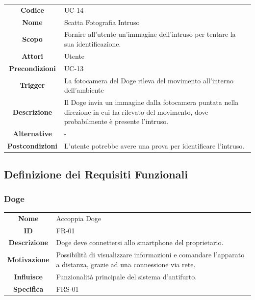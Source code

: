 \documentclass{article}
\begin{document}
\begin{adjustbox}{center}
\begin{tabular}{|c|p{10cm}|}
\hline
\textbf{Codice} & UC-14 \\
\textbf{Nome} & Scatta Fotografia Intruso \\
\textbf{Scopo} & Fornire all'utente un'immagine dell'intruso per tentare la sua identificazione. \\
\textbf{Attori} & Utente \\
\textbf{Precondizioni} & UC-13 \\
\textbf{Trigger} & La fotocamera del Doge rileva del movimento all'interno dell'ambiente \\
\textbf{Descrizione} & Il Doge invia un immagine dalla fotocamera puntata nella direzione in cui ha rilevato del movimento, dove probabilmente è presente
l'intruso. \\
\textbf{Alternative} & - \\
\textbf{Postcondizioni} & L'utente potrebbe avere una prova per identificare l'intruso. \\
\hline
\end{tabular}
\end{adjustbox}

\subsection{Definizione dei Requisiti Funzionali}

\subsubsection{Doge}

\begin{adjustbox}{center}
\begin{tabular}{|c|p{10cm}|}
\hline
\textbf{Nome} & Accoppia Doge \\
\textbf{ID} & FR-01 \\
\textbf{Descrizione} & Doge deve connettersi allo smartphone del proprietario. \\
\textbf{Motivazione} & Possibilità di visualizzare informazioni e comandare l'apparato a distanza, grazie ad una connessione via rete. \\
\textbf{Influisce} & Funzionalità principale del sistema d'antifurto. \\
\textbf{Specifica} & FRS-01 \\
\hline
\end{tabular}
\end{adjustbox}
\end{document}
